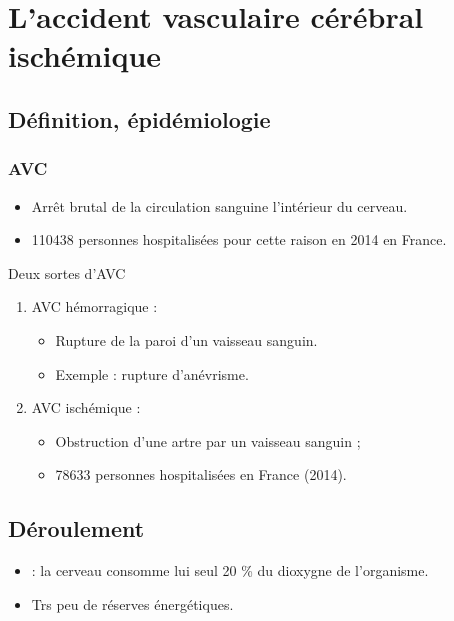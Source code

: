 \section{L'accident vasculaire c\'er\'ebral isch\'emique}






\subsection{D\'efinition, \'epid\'emiologie}

\begin{frame}
\frametitle{AVC}
\begin{itemize}
\item<+-> Arr\^et brutal de la circulation sanguine  l'int\'erieur du cerveau.
\item<+-> 110438 personnes hospitalis\'ees pour cette raison en 2014 en France.
\end{itemize}
\begin{block}{Deux sortes d'AVC}
\begin{enumerate}
\item<+-> AVC h\'emorragique :
\begin{itemize}
\item<+-> Rupture de la paroi d'un vaisseau sanguin.
\item<+-> Exemple : rupture d'an\'evrisme.
\end{itemize}
\item<+-> AVC isch\'emique :
\begin{itemize}
\item<+-> Obstruction d'une artre par un vaisseau sanguin ;
\item<+-> 78633 personnes hospitalis\'ees en France (2014).
\end{itemize}
\end{enumerate}
\end{block}
\end{frame}

\subsection{D\'eroulement}

\begin{frame}
\begin{itemize}
\item<+-> \cite{pat_neu} : la cerveau consomme  lui seul 20 \% du dioxygne de l'organisme.
\item<+-> Trs peu de r\'eserves \'energ\'etiques.
\end{itemize}
\end{frame}


